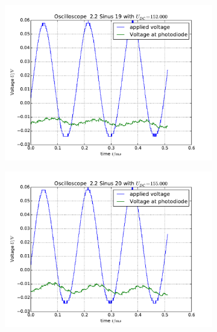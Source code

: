 \begin{figure}
    \begin{subfigure}[b]{\picwidth}
        \includegraphics[width=\textwidth]{analysis/figures/22sinus19}
        \caption{}
    \end{subfigure}\qquad
    \begin{subfigure}[b]{\picwidth}
        \includegraphics[width=\textwidth]{analysis/figures/22sinus20}
        \caption{}
    \end{subfigure}
    \begin{subfigure}[b]{\picwidth}

\end{subfigure}
\end{figure}
